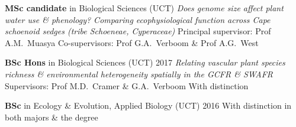 \begin{hangparas}{2em}{1}

\textbf{MSc candidate} in Biological Sciences (UCT)                       \break
\textit{Does genome size affect plant water use \& phenology?
  Comparing ecophysiological function across                              \break
  Cape schoenoid sedges (tribe Schoeneae, Cyperaceae)}                    \break
Principal supervisor: Prof A.M.~Muasya                                    \break
Co-supervisors: Prof G.A.~Verboom \& Prof A.G.~West

\textbf{BSc Hons} in Biological Sciences (UCT)                \hfill 2017 \break
\textit{Relating vascular plant species richness \&
  environmental heterogeneity spatially in the GCFR \& SWAFR}             \break
Supervisors: Prof M.D.~Cramer \& G.A.~Verboom                             \break
With distinction

\textbf{BSc} in Ecology \& Evolution, Applied Biology (UCT)   \hfill 2016 \break
With distinction in both majors \& the degree

\end{hangparas}
